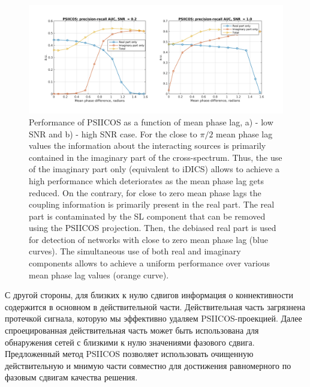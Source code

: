 \begin{figure}[!ht]
 \includegraphics[width=1\textwidth]{../images/psiicos_paper/Figure9_hr.jpg}
 \caption{Performance of PSIICOS as a function of mean phase lag, a) - low SNR
     and b) - high SNR case. For the close to $\pi/2$ mean phase lag values the
     information about the interacting sources is primarily contained in the
     imaginary part of the cross-spectrum.  Thus, the use of the imaginary part
     only (equivalent to iDICS) allows to achieve a high performance which
     deteriorates as the mean phase lag gets reduced.  On the contrary, for
     close to zero mean phase lags the coupling information is primarily
     present in the real part.  The real part is contaminated by the SL
     component that can be removed using the PSIICOS projection.  Then, the
     debiased real part is used for detection of networks with close to zero
     mean phase lag (blue curves).  The simultaneous use of both real and
 imaginary components allows to achieve a uniform performance over various mean
 phase lag values (orange curve).}
\label{fig:09}
\end{figure}%

С другой стороны, для близких к нулю сдвигов информация о коннективности содержится
в основном в действительной части. Действительная часть загрязнена протечкой сигнала, которую
мы эффективно удаляем PSIICOS-проекцией. Далее спроецированная действительная часть
может быть использована для обнаружения сетей с близкими к нулю значениями фазового
сдвига. Предложенный метод PSIICOS позволяет использовать очищенную действительную
и мнимую части совместно для достижения равномерного по фазовым сдвигам качества решения.

